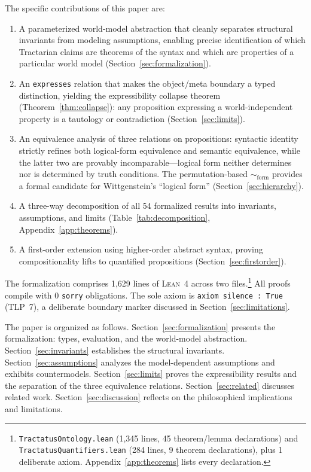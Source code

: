 \documentclass[10pt, letterpaper]{article}
\theoremstyle{definition}
\theoremstyle{remark}
\newcommand{\formEq}{\sim_{\mathrm{form}}}
\newcommand{\Lean}{\textsc{Lean}}
\begin{document}
\noindent
The specific contributions of this paper are:
\begin{enumerate}[nosep, label=(\arabic*)]
  \item A parameterized world-model abstraction that cleanly
    separates structural invariants from modeling assumptions,
    enabling precise identification of which Tractarian claims
    are theorems of the syntax and which are properties of a
    particular world model (Section~\ref{sec:formalization}).
  \item An \texttt{expresses} relation that makes the object/meta
    boundary a typed distinction, yielding the expressibility
    collapse theorem (Theorem~\ref{thm:collapse}): any proposition
    expressing a world-independent property is a tautology or
    contradiction (Section~\ref{sec:limits}).
  \item An equivalence analysis of three relations on
    propositions: syntactic identity strictly refines both
    logical-form equivalence and semantic equivalence, while the
    latter two are provably incomparable---logical form neither
    determines nor is determined by truth conditions.  The
    permutation-based $\formEq$ provides a formal candidate for
    Wittgenstein's ``logical form'' (Section~\ref{sec:hierarchy}).
  \item A three-way decomposition of all 54 formalized results
    into invariants, assumptions, and limits
    (Table~\ref{tab:decomposition}, Appendix~\ref{app:theorems}).
  \item A first-order extension using higher-order abstract syntax,
    proving compositionality lifts to quantified propositions
    (Section~\ref{sec:firstorder}).
\end{enumerate}

\noindent
The formalization comprises 1,629 lines of \Lean~4 across two
files.\footnote{%
  \texttt{TractatusOntology.lean} (1,345 lines, 45 theorem/lemma
  declarations) and \texttt{TractatusQuantifiers.lean} (284 lines,
  9 theorem declarations), plus 1 deliberate axiom.
  Appendix~\ref{app:theorems} lists every declaration.}
All proofs compile with 0 \texttt{sorry} obligations.
The sole axiom is \texttt{axiom silence : True} (TLP~7), a
deliberate boundary marker discussed in
Section~\ref{sec:limitations}.

The paper is organized as follows.
Section~\ref{sec:formalization} presents the formalization:
types, evaluation, and the world-model abstraction.
Section~\ref{sec:invariants} establishes the structural
invariants.
Section~\ref{sec:assumptions} analyzes the model-dependent
assumptions and exhibits countermodels.
Section~\ref{sec:limits} proves the expressibility results and
the separation of the three equivalence relations.
Section~\ref{sec:related} discusses related work.
Section~\ref{sec:discussion} reflects on the philosophical
implications and limitations.
\end{document}
